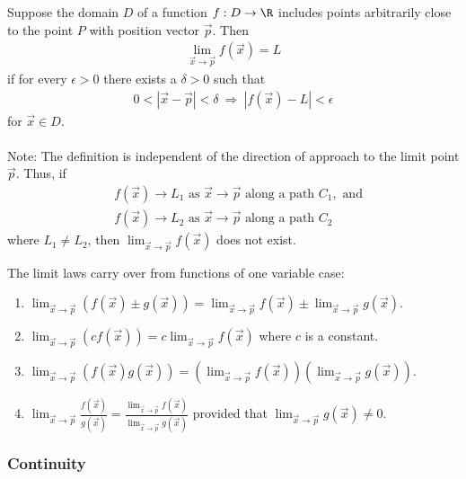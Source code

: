 \documentclass{article}
\begin{document}
\begin{definition}
    Suppose the domain $D$ of a function $f:D\to\R$ includes points
    arbitrarily close to the point $P$ with position vector $\vec p$.
    Then
    \begin{align*}
        \lim_{\vec x\to \vec p}f(\vec x)=L
    \end{align*}
    if for every $\epsilon>0$ there exists a $\delta > 0$ such that
    \begin{align*}
        0 < |\vec x - \vec p| < \delta \:\Rightarrow\: |f(\vec x)-L|<\epsilon
    \end{align*}
    for $\vec x \in D$.\\\\
    Note: The definition is independent of the direction of approach to the
    limit point $\vec p$. Thus, if
    \begin{align*}
        &f(\vec x)\to L_1 \text{ as } \vec x\to\vec p \text{ along a path } C_1, \text{ and}\\
        &f(\vec x)\to L_2 \text{ as } \vec x\to\vec p \text{ along a path } C_2
    \end{align*}
    where $L_1 \not= L_2$, then $\lim_{\vec x\to\vec p} f(\vec x)$ does not exist.
\end{definition}
\begin{theorem}
    The limit laws carry over from functions of one variable case:
    \begin{enumerate}
        \item $\lim_{\vec x\to\vec p}\left(f(\vec x)\pm g(\vec x)\right) =
               \lim_{\vec x\to\vec p}f(\vec x)\pm\lim_{\vec x\to\vec p}g(\vec x)$.
        \item $\lim_{\vec x\to\vec p}\left(cf(\vec x)\right) =
              c\lim_{\vec x\to\vec p}f(\vec x)$ where $c$ is a constant.
        \item $\lim_{\vec x\to\vec p}\left(f(\vec x)g(\vec x)\right) =
               \left(\lim_{\vec x\to\vec p}f(\vec x)\right)
               \left(\lim_{\vec x\to\vec p}g(\vec x)\right)$.
        \item $\lim_{\vec x\to\vec p}\frac{f(\vec x)}{g(\vec x)}
               =\frac{\lim_{\vec x\to\vec p}f(\vec x)}{\lim_{\vec x\to\vec p}g(\vec x)}$
               provided that $\lim_{\vec x\to\vec p}g(\vec x)\not=0$.
    \end{enumerate}
\end{theorem}

\subsubsection{Continuity}
\end{document}
